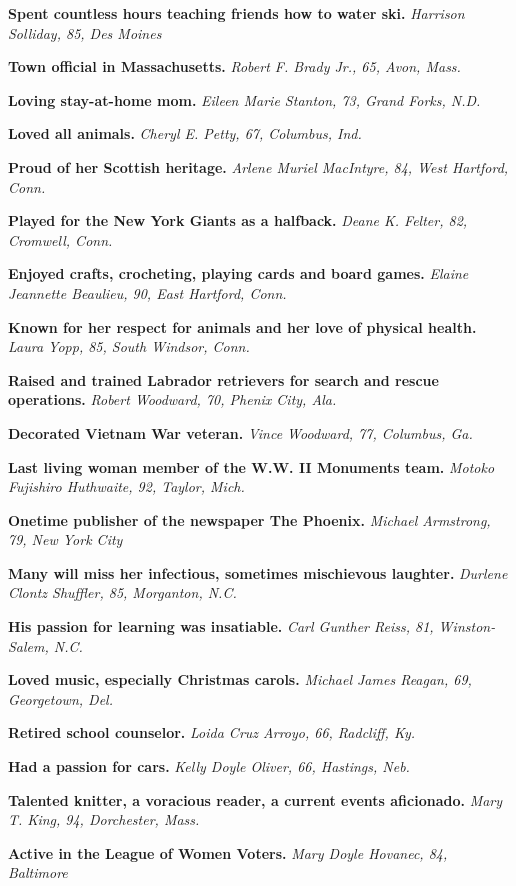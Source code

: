 \textbf{Spent countless hours teaching friends how to water ski.}
\emph{Harrison Solliday, 85, Des Moines}

\textbf{Town official in Massachusetts.} \emph{Robert F. Brady Jr., 65,
Avon, Mass.}

\textbf{Loving stay-at-home mom.} \emph{Eileen Marie Stanton, 73, Grand
Forks, N.D.}

\textbf{Loved all animals.} \emph{Cheryl E. Petty, 67, Columbus, Ind.}

\textbf{Proud of her Scottish heritage.} \emph{Arlene Muriel MacIntyre,
84, West Hartford, Conn.}

\textbf{Played for the New York Giants as a halfback.} \emph{Deane K.
Felter, 82, Cromwell, Conn.}

\textbf{Enjoyed crafts, crocheting, playing cards and board games.}
\emph{Elaine Jeannette Beaulieu, 90, East Hartford, Conn.}

\textbf{Known for her respect for animals and her love of physical
health.} \emph{Laura Yopp, 85, South Windsor, Conn.}

\textbf{Raised and trained Labrador retrievers for search and rescue
operations.} \emph{Robert Woodward, 70, Phenix City, Ala.}

\textbf{Decorated Vietnam War veteran.} \emph{Vince Woodward, 77,
Columbus, Ga.}

\textbf{Last living woman member of the W.W. II Monuments team.}
\emph{Motoko Fujishiro Huthwaite, 92, Taylor, Mich.}

\textbf{Onetime publisher of the newspaper The Phoenix.} \emph{Michael
Armstrong, 79, New York City}

\textbf{Many will miss her infectious, sometimes mischievous laughter.}
\emph{Durlene Clontz Shuffler, 85, Morganton, N.C.}

\textbf{His passion for learning was insatiable.} \emph{Carl Gunther
Reiss, 81, Winston-Salem, N.C.}

\textbf{Loved music, especially Christmas carols.} \emph{Michael James
Reagan, 69, Georgetown, Del.}

\textbf{Retired school counselor.} \emph{Loida Cruz Arroyo, 66,
Radcliff, Ky.}

\textbf{Had a passion for cars.} \emph{Kelly Doyle Oliver, 66, Hastings,
Neb.}

\textbf{Talented knitter, a voracious reader, a current events
aficionado.} \emph{Mary T. King, 94, Dorchester, Mass.}

\textbf{Active in the League of Women Voters.} \emph{Mary Doyle Hovanec,
84, Baltimore}

